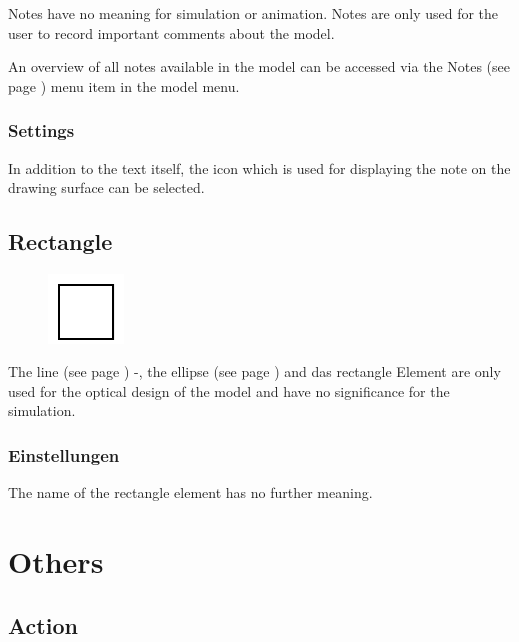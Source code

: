 Notes have no meaning for simulation or animation.
Notes are only used for the user to record important comments about the model.

An overview of all notes available in the model can be accessed via
the Notes (see page \pageref{ref:Notes}) menu item in the model menu.

\subsection*{Settings}

In addition to the text itself, the icon which is used for displaying
the note on the drawing surface can be selected.


\section{Rectangle}
\label{ref:ModelElementRectangle}

\begin{figure}
\vspace{-22pt}
\includegraphics[width=2cm]{imageModelElementRectangle.png}
\vspace{-22pt}
\end{figure}

The line (see page \pageref{ref:ModelElementLine}) -, the ellipse (see page \pageref{ref:ModelElementEllipse}) and
das rectangle Element are only used for the optical design of the model and have no significance for the simulation.

\subsection*{Einstellungen}

The name of the rectangle element has no further meaning.





\chapter{Others}

\section{Action}
\label{ref:ModelElementAction}

